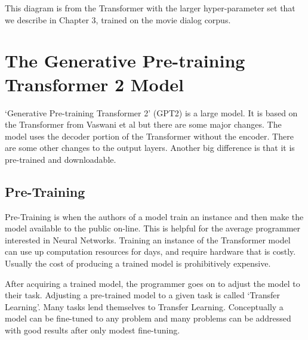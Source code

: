 This diagram is from the Transformer with the larger hyper-parameter set that we describe in Chapter 3, trained on the movie dialog corpus.


\section{The Generative Pre-training Transformer 2 Model}

`Generative Pre-training Transformer 2' (\ac{GPT2}) is a large model. It is based on the Transformer from Vaswani et al \cite{Vaswani2017AttentionIA} but there are some major changes. The model uses the decoder portion of the Transformer without the encoder. There are some other changes to the output layers. Another big difference is that it is pre-trained and downloadable.

\subsection{Pre-Training}
Pre-Training is when the authors of a model train an instance and then make the model available to the public on-line. This is helpful for the average programmer interested in Neural Networks. Training an instance of the Transformer model can use up computation resources for days, and require hardware that is costly. Usually the cost of producing a trained model is prohibitively expensive.

After acquiring a trained model, the programmer goes on to adjust the model to their task. Adjusting a pre-trained model to a given task is called `Transfer Learning'. Many tasks lend themselves to Transfer Learning. Conceptually a model can be fine-tuned to any problem and many problems can be addressed with good results after only modest fine-tuning.

